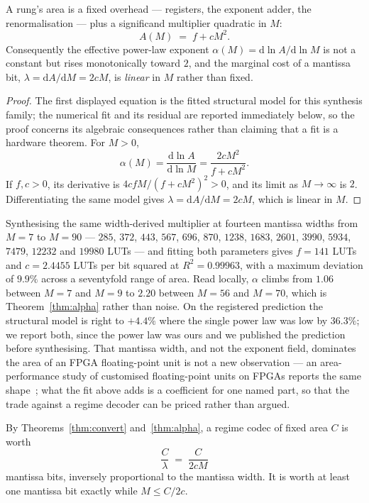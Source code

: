 \begin{theorem}
\label{thm:alpha}
A rung's area is a fixed overhead --- registers, the exponent adder, the
renormalisation --- plus a significand multiplier quadratic in $M$:
\[
A(M) \;=\; f + cM^{2}.
\]
Consequently the effective power-law exponent
$\alpha(M) = \mathrm{d}\ln A/\mathrm{d}\ln M$ is not a constant but rises
monotonically toward $2$, and the marginal cost of a mantissa bit,
$\lambda = \mathrm{d}A/\mathrm{d}M = 2cM$, is \emph{linear} in $M$ rather than
fixed.
\end{theorem}
\begin{proof}
The first displayed equation is the fitted structural model for this synthesis
family; the numerical fit and its residual are reported immediately below, so
the proof concerns its algebraic consequences rather than claiming that a fit is
a hardware theorem. For $M>0$,
\[
\alpha(M)=\frac{\mathrm d\ln A}{\mathrm d\ln M}
          =\frac{2cM^{2}}{f+cM^{2}}.
\]
If $f,c>0$, its derivative is
$4cfM/(f+cM^{2})^{2}>0$, and its limit as $M\to\infty$ is $2$.
Differentiating the same model gives
$\lambda=\mathrm dA/\mathrm dM=2cM$, which is linear in $M$.
\end{proof}

Synthesising the same width-derived multiplier at fourteen mantissa widths from
$M{=}7$ to $M{=}90$ --- $285$, $372$, $443$, $567$, $696$, $870$, $1238$, $1683$,
$2601$, $3990$, $5934$, $7479$, $12232$ and $19980$ LUTs --- and fitting both
parameters gives $f = 141$ LUTs and $c = 2.4455$ LUTs per bit squared at
$R^2 = 0.99963$, with a maximum deviation of $9.9\%$ across a seventyfold range of
area. Read locally, $\alpha$ climbs from $1.06$ between $M{=}7$ and $M{=}9$ to
$2.20$ between $M{=}56$ and $M{=}70$, which is Theorem~\ref{thm:alpha} rather than
noise. On the registered prediction the structural model is right to $+4.4\%$
where the single power law was low by $36.3\%$; we report both, since the power
law was ours and we published the prediction before synthesising. That mantissa
width, and not the exponent field, dominates the area of an FPGA floating-point
unit is not a new observation --- an area-performance study of customised
floating-point units on FPGAs reports the same shape~\cite{echeverria2011customizing};
what the fit above adds is a coefficient for one named part, so that the trade
against a regime decoder can be priced rather than argued.

\begin{theorem}
\label{thm:oneoverm}
By Theorems~\ref{thm:convert} and~\ref{thm:alpha}, a regime codec of fixed area
$C$ is worth
\[
\frac{C}{\lambda} \;=\; \frac{C}{2cM}
\]
mantissa bits, inversely proportional to the mantissa width. It is worth at least
one mantissa bit exactly while $M \leq C/2c$.
\end{theorem}

